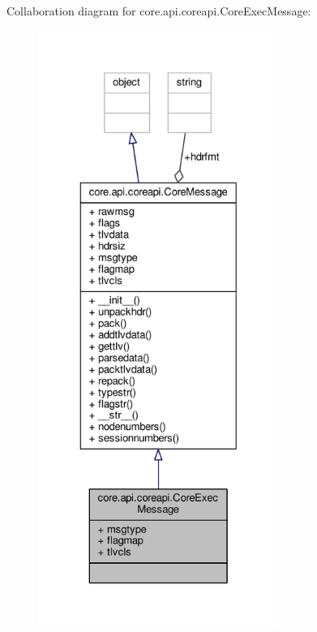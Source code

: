 Collaboration diagram for core.\+api.\+coreapi.\+Core\+Exec\+Message\+:
\nopagebreak
\begin{figure}[H]
\begin{center}
\leavevmode
\includegraphics[height=550pt]{classcore_1_1api_1_1coreapi_1_1_core_exec_message__coll__graph}
\end{center}
\end{figure}
